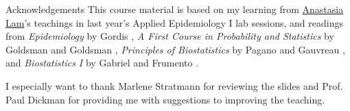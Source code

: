 \begin{frame}{Acknowledgements}
This course material is based on my learning from \href{https://staff.ki.se/people/analam}{Anastasia Lam}'s teachings in last year's Applied Epidemiology I lab sessions, and readings from \textit{Epidemiology} by Gordis \cite{Gordis2014}, \textit{A First Course in Probability and Statistics} by Goldsman and Goldsman \cite{Goldsman2020}, \textit{Principles of Biostatistics} by Pagano and Gauvreau \cite{Pagano2000}, and \textit{Biostatistics I} by Gabriel and Frumento \cite{Gabriel2020}. 

I especially want to thank Marlene Stratmann for reviewing the slides and Prof. Paul Dickman for providing me with suggestions to improving the teaching.

\end{frame}
